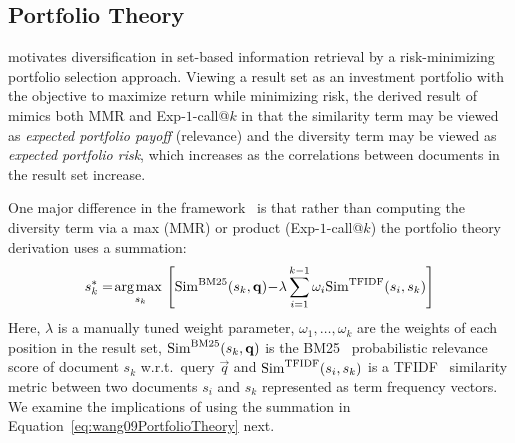 \subsection{Portfolio Theory}
\cite{wang09PortfolioTheory} motivates
diversification in set-based information retrieval by a
risk-minimizing portfolio selection approach. Viewing a result set as
an investment portfolio with the objective to maximize return while
minimizing risk, the derived result of~\cite{wang09PortfolioTheory}
mimics both MMR and Exp-$1$-call@$k$ in that the similarity term may
be viewed as \emph{expected portfolio payoff} (relevance) and the
diversity term may be viewed as \emph{expected portfolio risk}, which
increases as the correlations between documents in the result set
increase. 

One major difference in the
framework~\cite{wang09PortfolioTheory} is that rather than computing
the diversity term via a max (MMR) or product (Exp-$1$-call@$k$) the
portfolio theory derivation uses a summation: 
\begin{align}
s_{k}^{*} = \argmax_{s_{k}} \left[ \Sim^{\text{BM25}}(s_k,\vec{q}) \hspace{-.7mm} - \hspace{-.7mm} \lambda \sum_{i=1}^{k-1} \omega_{i} \Sim^{\text{TFIDF}}(s_i,s_k) \right]
\label{eq:wang09PortfolioTheory}
\end{align}
Here, $\lambda$ is a manually tuned weight parameter, $\omega_1,\ldots,\omega_k$
are the weights of each position in the result set,
$\Sim^{\text{BM25}}(s_k,\vec{q})$ is the BM25~\cite{bm25} probabilistic
relevance score of document $s_k$ w.r.t.\ query $\vec{q}$ and
$\Sim^{\text{TFIDF}}(s_i,s_k)$ is a TFIDF~\cite{salton83Introduction}
similarity metric between two documents $s_i$ and $s_k$ represented as term
frequency vectors. We examine the implications of using the summation in Equation~\eqref{eq:wang09PortfolioTheory} next.

